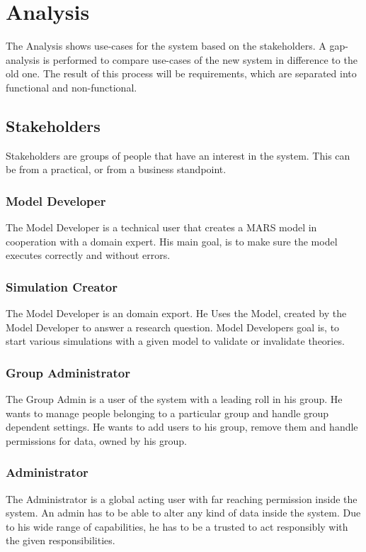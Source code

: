 
\chapter{Analysis}
The Analysis shows use-cases for the system based on the stakeholders. A gap-analysis is performed to compare use-cases of the new system in difference to the old one. The result of this process will be requirements, which are separated into functional and non-functional.


\section{Stakeholders}
Stakeholders are groups of people that have an interest in the system. This can be from a practical, or from a business standpoint.

\subsection{Model Developer}
The Model Developer is a technical user that creates a MARS model in cooperation with a domain expert. His main goal, is to make sure the model executes correctly and without errors.

\subsection{Simulation Creator}
The Model Developer is an domain export. He Uses the Model, created by the Model Developer to answer a research question. Model Developers goal is, to start various simulations with a given model to validate or invalidate theories.

\subsection{Group Administrator}
The Group Admin is a user of the system with a leading roll in his group. He wants to manage people belonging to a particular group and handle group dependent settings. He wants to add users to his group, remove them and handle permissions for data, owned by his group.

\subsection{Administrator}
The Administrator is a global acting user with far reaching permission inside the system. An admin has to be able to alter any kind of data inside the system. Due to his wide range of capabilities, he has to be a trusted to act responsibly with the given responsibilities.


